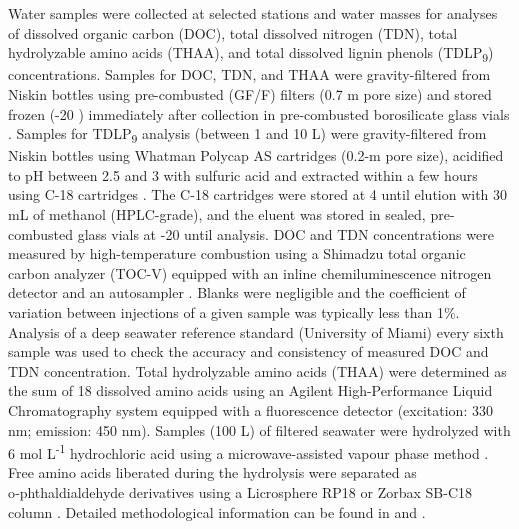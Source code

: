 \documentclass[essd, manuscript]{copernicus}
\begin{document}
Water samples were collected at selected stations and water masses for analyses of dissolved organic carbon (DOC), total dissolved nitrogen (TDN), total hydrolyzable amino acids (THAA), and total dissolved lignin phenols (TDLP\textsubscript{9}) concentrations. Samples for DOC, TDN, and THAA were gravity-filtered from Niskin bottles using pre-combusted (GF/F) filters (0.7 \textmu m pore size) and stored frozen (-20 \textcelsius{}) immediately after collection in pre-combusted borosilicate glass vials \citep{Shen2012}. Samples for TDLP\textsubscript{9} analysis (between 1 and 10 L) were gravity-filtered from Niskin bottles using Whatman Polycap AS cartridges (0.2-\textmu m pore size), acidified to pH between 2.5 and 3 with sulfuric acid and extracted within a few hours using C-18 cartridges \citep{Louchouarn2000, Fichot2013}. The C-18 cartridges were stored at 4 \textcelsius{} until elution with 30 mL of methanol (HPLC-grade), and the eluent was stored in sealed, pre-combusted glass vials at -20 \textcelsius{} until analysis. DOC and TDN concentrations were measured by high-temperature combustion using a Shimadzu total organic carbon analyzer (TOC-V) equipped with an inline chemiluminescence nitrogen detector and an autosampler \citep{Benner1993}. Blanks were negligible and the coefficient of variation between injections of a given sample was typically less than 1\%. Analysis of a deep seawater reference standard (University of Miami) every sixth sample was used to check the accuracy and consistency of measured DOC and TDN concentration. Total hydrolyzable amino acids (THAA) were determined as the sum of 18 dissolved amino acids using an Agilent High-Performance Liquid Chromatography system equipped with a fluorescence detector (excitation: 330 nm; emission: 450 nm). Samples (100 \textmu L) of filtered seawater were hydrolyzed with 6 mol L\textsuperscript{-1} hydrochloric acid using a microwave-assisted vapour phase method \citep{Kaiser2005}. Free amino acids liberated during the hydrolysis were separated as o‑phthaldialdehyde derivatives using a Licrosphere RP18 or Zorbax SB-C18 column \citep{Shen2012}. Detailed methodological information can be found in \citet{Fichot2013} and \citet{Shen2012}.
\end{document}
